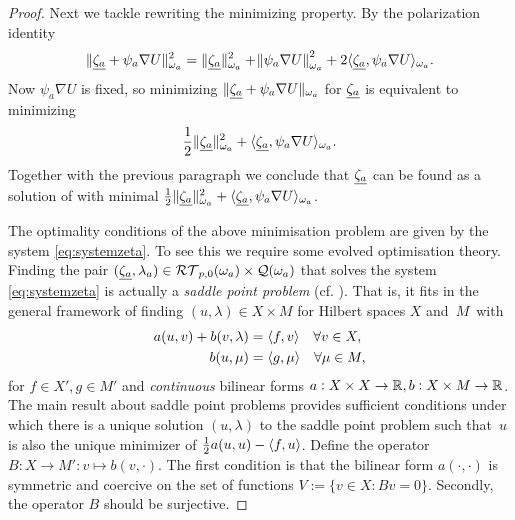 \documentclass[thesis.tex]{subfiles}
\begin{document}
\begin{proof}
  Next we tackle rewriting the minimizing property. By the polarization identity
  \[
    \| \underline{\zeta_a} + \psi_a \nabla U \|_{\omega_a}^2 = \| \underline{\zeta_a} \|_{\omega_a}^2 + \norm{\psi_a \nabla U}^2_{\omega_a} + 2 \langle \underline{\zeta_a}, \psi_a \nabla 
    U \rangle_{\omega_a}.
  \]
  Now $\psi_a \nabla U$ is fixed,  so minimizing $\| \underline{\zeta_a} + \psi_a \nabla U \|_{\omega_a}$ for $\underline{\zeta_a}$ is equivalent to minimizing
  \[
    \frac{1}{2} \| \underline{\zeta_a} \|^2_{\omega_a} + \langle \underline{\zeta_a}, \psi_a \nabla U \rangle_{\omega_a}.
  \]
  Together with the previous paragraph we conclude that $\underline{\zeta_a}$ can be found as a solution of \label{eq:defzetanoproj} with
  minimal $\frac{1}{2} \| \underline{\zeta_a} \|^2_{\omega_a} + \langle \underline{\zeta_a}, \psi_a \nabla U \rangle_{\omega_a}$.

  The optimality conditions of the above minimisation problem are given by the system \eqref{eq:systemzeta}.
  To see this we require some evolved optimisation theory. 
  Finding the pair $(\underline{\zeta_a}, {{\lambda_a}}) \in \mathcal{RT}_{p,0}(\omega_a) \times \mathcal{Q}(\omega_a)$ that solves the system 
  \eqref{eq:systemzeta} is actually a \emph{saddle point problem} (cf. \cite{brezzimixed, braess2007finite}).
  That is, it fits in the general framework of finding $(u, \lambda) \in X \times M$ for Hilbert spaces $X$ and~$M$~with
    \begin{align*}
      a(u,v) + b(v,\lambda) &= \langle f,v \rangle \quad \forall v \in X,\\
      b(u, \mu) &= \langle g,\mu \rangle \quad \forall \mu \in M,
    \end{align*}
    for $f \in X', g \in M'$ and \emph{continuous} bilinear forms $a: X \times X \to \mathbb{R}, b : X \times M \to \mathbb{R}$.
    The main result about saddle point problems \cite[Thm~4.2.1]{brezzimixed} provides sufficient conditions under which there 
    is a unique solution $(u, \lambda)$ to the saddle point problem such that~$u$ is also the unique minimizer of 
    $\frac{1}{2} a(u,u) - \langle f,u \rangle$. Define the operator $B: X \to M' : v \mapsto b(v,\cdot)$. The first condition is that the bilinear form $a(\cdot, \cdot)$ is
    symmetric and coercive on the set of functions $V := \{v \in X : Bv = 0\}$.
    Secondly, the operator $B$ should be surjective.


\end{proof}
\end{document}
